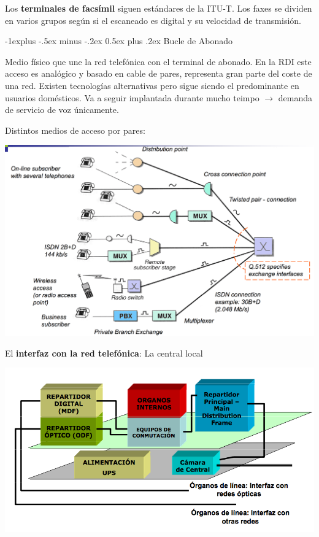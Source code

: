 \documentclass[10pt,portrait, twocolumn]{article}
\makeatletter
\renewcommand{\subsection}{\@startsection{subsection}{2}{0mm}%
                                {-1explus -.5ex minus -.2ex}%
                                {0.5ex plus .2ex}%
                                {\normalfont\normalsize\bfseries}}
\makeatother
\begin{document}
Los \textbf{terminales de facsímil} siguen estándares de la ITU-T. Los faxes se dividen en varios grupos según si el escaneado es digital y su velocidad de transmisión.

\hrulefill

\subsection{Bucle de Abonado}

Medio físico que une la red telefónica con el terminal de abonado. En la RDI este acceso es analógico y basado en cable de pares, representa gran parte del coste de una red. Existen tecnologías alternativas pero sigue siendo el predominante en usuarios domésticos. Va a seguir implantada durante mucho teimpo $\rightarrow$ demanda de servicio de voz únicamente.

Distintos medios de acceso por pares:

	\begin{center}
		\includegraphics[scale=0.2]{images/BucleIntro}
	\end{center}

El \textbf{interfaz con la red telefónica}: La central local

	\begin{center}
		\includegraphics[scale=0.2]{images/CentralLocal}
	\end{center}
\end{document}
